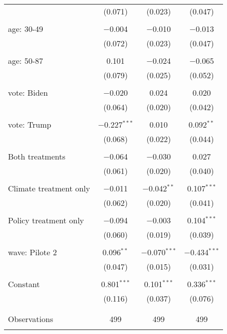\begin{tabular}{@{\extracolsep{5pt}}lccc}
  & (0.071) & (0.023) & (0.047) \\ 
  & & & \\ 
 age: 30-49 & $-$0.004 & $-$0.010 & $-$0.013 \\ 
  & (0.072) & (0.023) & (0.047) \\ 
  & & & \\ 
 age: 50-87 & 0.101 & $-$0.024 & $-$0.065 \\ 
  & (0.079) & (0.025) & (0.052) \\ 
  & & & \\ 
 vote: Biden & $-$0.020 & 0.024 & 0.020 \\ 
  & (0.064) & (0.020) & (0.042) \\ 
  & & & \\ 
 vote: Trump & $-$0.227$^{***}$ & 0.010 & 0.092$^{**}$ \\ 
  & (0.068) & (0.022) & (0.044) \\ 
  & & & \\ 
 Both treatments & $-$0.064 & $-$0.030 & 0.027 \\ 
  & (0.061) & (0.020) & (0.040) \\ 
  & & & \\ 
 Climate treatment only & $-$0.011 & $-$0.042$^{**}$ & 0.107$^{***}$ \\ 
  & (0.062) & (0.020) & (0.041) \\ 
  & & & \\ 
 Policy treatment only & $-$0.094 & $-$0.003 & 0.104$^{***}$ \\ 
  & (0.060) & (0.019) & (0.039) \\ 
  & & & \\ 
 wave: Pilote 2 & 0.096$^{**}$ & $-$0.070$^{***}$ & $-$0.434$^{***}$ \\ 
  & (0.047) & (0.015) & (0.031) \\ 
  & & & \\ 
 Constant & 0.801$^{***}$ & 0.101$^{***}$ & 0.336$^{***}$ \\ 
  & (0.116) & (0.037) & (0.076) \\ 
  & & & \\ 
\hline \\[-1.8ex] 

Observations & 499 & 499 & 499 \\ 
\hline 
\hline \\[-1.8ex] 
\end{tabular} 